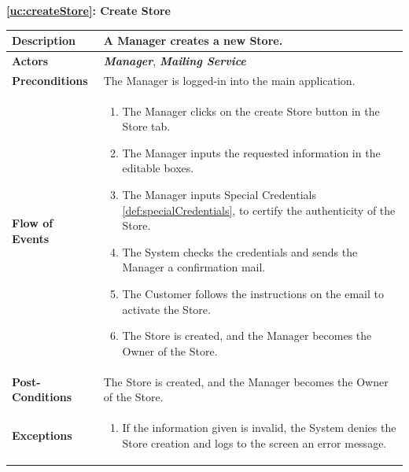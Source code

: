 \documentclass[a4paper, 12pt, oneside]{article}
\begin{document}
\begin{center}
{\textbf{\ref{uc:createStore}: Create Store}}
\end{center}
\begin{tabularx}{\linewidth}{| l | X |}
	
	\hline
	\textbf{Description} & A Manager creates a new Store.\\
	

	\hline
	\textbf{Actors} & \textbf{\textit{Manager}}, \textit{\textbf{Mailing Service}} \\
	
	\hline
	\textbf{Preconditions} & The Manager is logged-in into the main application. \\
	
	\hline
	\textbf{Flow of Events} & \parbox{0.7\textwidth}{	
		\begin{enumerate}
			\item The Manager clicks on the create Store button in the Store tab.
			\item The Manager inputs the requested information in the editable boxes.
			\item The Manager inputs Special Credentials \ref{def:specialCredentials}, to certify the authenticity of the Store.
			\item The System checks the credentials and sends the Manager a confirmation mail.
			\item The Customer follows the instructions on the email to activate the Store.
			\item The Store is created, and the Manager becomes the Owner of the Store.
	\end{enumerate}}\\
	
	\hline
	\textbf{Post-Conditions} & The Store is created, and the Manager becomes the Owner of the Store.\\
	
	\hline
	\textbf{Exceptions} & \parbox{0.7\textwidth}{ \begin{enumerate}
			\item If the information given is invalid, the System denies the Store creation and logs to the screen an error message.
		\end{enumerate}}\\

	\hline
\end{tabularx}
\end{document}
